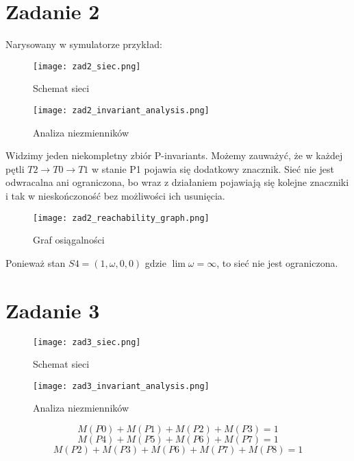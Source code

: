 \documentclass{article}
\begin{document}
\section{Zadanie 2}
Narysowany w symulatorze przykład:

\begin{figure}[H]
\centering
\texttt{[image: zad2\_siec.png]}
\caption{Schemat sieci}
\end{figure}


\begin{figure}[H]
\centering
\texttt{[image: zad2\_invariant\_analysis.png]}
\caption{Analiza niezmienników}
\end{figure}

Widzimy jeden niekompletny zbiór P-invariants. Możemy zauważyć, że w każdej pętli $T2\rightarrow T0 \rightarrow T1$ w stanie P1 pojawia się dodatkowy znacznik. Sieć nie jest odwracalna ani ograniczona, bo wraz z działaniem pojawiają się kolejne znaczniki i tak w nieskończoność bez możliwości ich usunięcia.

\begin{figure}[H]
\centering
\texttt{[image: zad2\_reachability\_graph.png]}
\caption{Graf osiągalności}
\end{figure}

Ponieważ stan $S4 = (1, \omega, 0, 0)$ gdzie $\lim \omega = \infty$, to sieć nie jest ograniczona.

\section{Zadanie 3}

\begin{figure}[H]
\centering
\texttt{[image: zad3\_siec.png]}
\caption{Schemat sieci}
\end{figure}

\begin{figure}[H]
\centering
\texttt{[image: zad3\_invariant\_analysis.png]}
\caption{Analiza niezmienników}
\end{figure}

\begin{equation}
    M(P0) + M(P1) + M(P2) + M(P3) = 1 \label{eq:3_1}
\end{equation}
\begin{equation}
    M(P4) + M(P5) + M(P6) + M(P7) = 1 \label{eq:3_2}
\end{equation}
\begin{equation}
    M(P2) + M(P3) + M(P6) + M(P7) + M(P8) = 1 \label{eq:3_3}
\end{equation}
\end{document}
